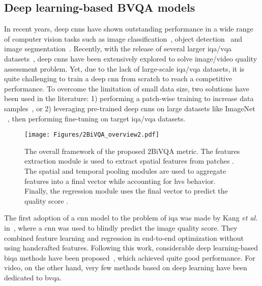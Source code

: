 \documentclass[journal]{IEEEtran}
\begin{document}
\subsection{Deep learning-based BVQA models}
In recent years, deep \acp{cnn} have shown outstanding  performance in a wide range of computer vision tasks such as image classification~\cite{simonyan2014very,he2016deep}, object detection~\cite{bochkovskiy2020yolov4, girshick2015fast} and image segmentation~\cite{ronneberger2015u, liu2015parsenet}. Recently, with the release of several larger \ac{iqa}/\ac{vqa} datasets~\cite{ghadiyaram2015massive, wang2019youtube,gotz2021konvid, min2017unified}, deep \acp{cnn} have been extensively explored to solve image/video quality assessment problem. Yet, due to the lack of large-scale \ac{iqa}/\ac{vqa} datasets, it is quite challenging to train a deep \ac{cnn} from scratch to reach a competitive performance. To overcome the limitation of small data size, two solutions have been used in the literature: 1) performing a patch-wise training to increase data samples~\cite{kang2014convolutional, kim2017deep}, or 2) leveraging pre-trained deep \acp{cnn} on large datasets like ImageNet ~\cite{deng2009imagenet}, then performing fine-tuning on target \ac{iqa}/\ac{vqa} datasets.

\begin{figure*}[!t]
  \centering
  \centerline{\texttt{[image: Figures/2BiVQA\_overview2.pdf]}}


\caption{The overall framework of the proposed 2BiVQA metric. The features extraction module is used to extract spatial features  from patches . The spatial and temporal pooling modules are used to aggregate features into a final vector  while accounting for \ac{hvs} behavior. Finally, the regression module uses the final vector  to predict the quality score .}
\label{overall} \vspace{-4mm}
\end{figure*}

The first adoption of a \ac{cnn} model to the problem of \ac{iqa} was made by Kang \textit{et al.} in~\cite{kang2014convolutional}, where a \ac{cnn} was used to blindly predict the image quality score. They combined feature learning and regression in end-to-end optimization without using handcrafted features. Following this work, considerable deep learning-based \ac{biqa} methods have been proposed~\cite{yang2019survey, sun2023blind}, which achieved quite good performance. For video, on the other hand, very few methods based on deep learning have been dedicated to \ac{bvqa}.
\end{document}
